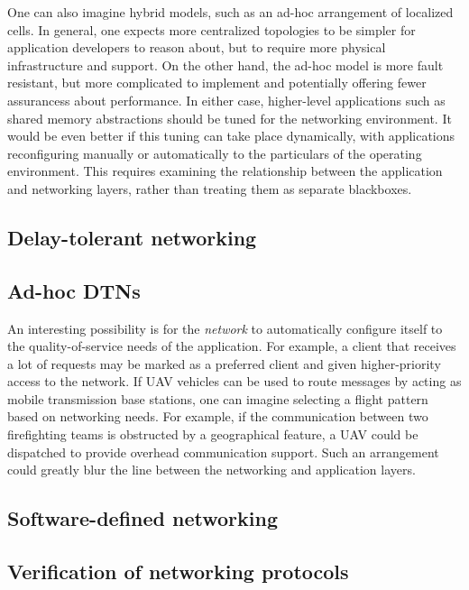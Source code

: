 \documentclass[]             %
{NASA}                       %
\theoremstyle{definition}
\begin{document}
One can also imagine hybrid models, such as an ad-hoc arrangement of
localized cells. In general, one expects more centralized topologies to
be simpler for application developers to reason about, but to require
more physical infrastructure and support. On the other hand, the ad-hoc
model is more fault resistant, but more complicated to implement and
potentially offering fewer assurancess about performance. In either
case, higher-level applications such as shared memory abstractions
should be tuned for the networking environment. It would be even better
if this tuning can take place dynamically, with applications
reconfiguring manually or automatically to the particulars of the
operating environment. This requires examining the relationship between
the application and networking layers, rather than treating them as
separate blackboxes.

\hypertarget{delay-tolerant-networking}{%
  \subsection{Delay-tolerant networking}\label{delay-tolerant-networking}}

\hypertarget{ad-hoc-dtns}{%
  \subsection{Ad-hoc DTNs}\label{ad-hoc-dtns}}

An interesting possibility is for the \emph{network} to automatically
configure itself to the quality-of-service needs of the application. For
example, a client that receives a lot of requests may be marked as a
preferred client and given higher-priority access to the network. If UAV
vehicles can be used to route messages by acting as mobile transmission
base stations, one can imagine selecting a flight pattern based on
networking needs. For example, if the communication between two
firefighting teams is obstructed by a geographical feature, a UAV could
be dispatched to provide overhead communication support. Such an
arrangement could greatly blur the line between the networking and
application layers.

\hypertarget{software-defined-networking}{%
  \subsection{Software-defined
    networking}\label{software-defined-networking}}

\hypertarget{verification-of-networking-protocols}{%
  \subsection{Verification of networking
    protocols}\label{verification-of-networking-protocols}}
\end{document}
